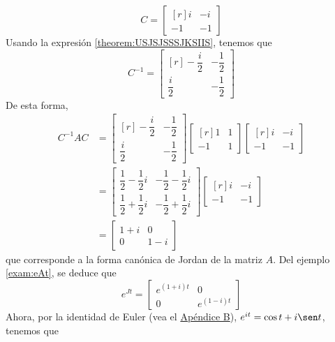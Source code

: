 \begin{example}
    $$C = \begin{bmatrix*}[r] i & -i \\ -1 & -1 \end{bmatrix*}$$
    Usando la expresión \ref{theorem:USJSJSSSJKSIIS}, tenemos que
    $$C^{-1} = \begin{bmatrix*}[r]
        -\dfrac{i}{2} & -\dfrac{1}{2} \\[2mm]
        \dfrac{i}{2} & -\dfrac{1}{2}
    \end{bmatrix*}$$
    De esta forma,
    \begin{align*}
        C^{-1}AC & = \begin{bmatrix*}[r]
            -\dfrac{i}{2} & -\dfrac{1}{2} \\[3mm]
            \dfrac{i}{2} & -\dfrac{1}{2}
        \end{bmatrix*} \begin{bmatrix*}[r]
            1 & 1 \\
            -1 & 1
        \end{bmatrix*} \begin{bmatrix*}[r]
            i & -i \\
            -1 & -1
        \end{bmatrix*} \\
        & = \begin{bmatrix}
            \dfrac{1}{2} - \dfrac{1}{2}i & -\dfrac{1}{2} - \dfrac{1}{2}i \\[3mm]
            \dfrac{1}{2} + \dfrac{1}{2}i & -\dfrac{1}{2} + \dfrac{1}{2}i
        \end{bmatrix} \begin{bmatrix*}[r]
            i & -i \\
            -1 & -1
        \end{bmatrix*} \\
        & = \begin{bmatrix}
            1 + i & 0 \\
            0 & 1 - i
        \end{bmatrix}
    \end{align*}
    que corresponde a la forma canónica de Jordan de la matriz $A$. Del ejemplo \ref{exam:eAt}, se deduce que
    $$e^{Jt} = \begin{bmatrix}
        e^{(1 + i)t} & 0 \\
        0 & e^{(1 - i)t}
    \end{bmatrix}$$\newpage\noindent
    Ahora, por la identidad de Euler (vea el \hyperref[chap:numeros-complejos]{Apéndice B}), $e^{it} = \cos t + i \sen t$, tenemos que

\end{example}
